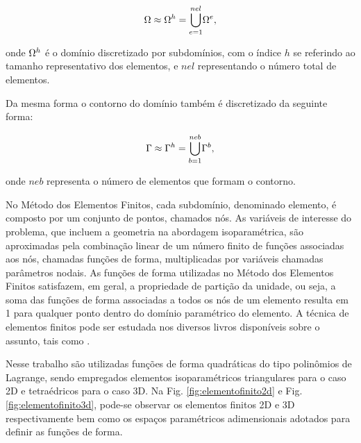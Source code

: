 \documentclass[tese_patricia]{subfiles}%
\begin{document}
\begin{align}
	\Omega \approx \Omega^{h} = {\bigcup_{e = 1}^{nel}} \Omega^{e},
\end{align}

\noindent onde $\Omega^{h}$ é o domínio discretizado por subdomínios, com o índice $h$ se referindo ao tamanho representativo dos elementos, e $nel$ representando o número total de elementos.

Da mesma forma o contorno do domínio também é discretizado da seguinte forma:

\begin{align}
	\Gamma \approx \Gamma^{h} = {\bigcup_{b = 1}^{neb}} \Gamma^{b},
\end{align}

\noindent onde $neb$ representa o número de elementos que formam o contorno.

No Método dos Elementos Finitos, cada subdomínio, denominado elemento, é composto por um conjunto de pontos, chamados nós. As variáveis de interesse do problema, que incluem a geometria na abordagem isoparamétrica, são aproximadas pela combinação linear de um número finito de funções associadas aos nós, chamadas funções de forma, multiplicadas por variáveis chamadas parâmetros nodais. As funções de forma utilizadas no Método dos Elementos Finitos satisfazem, em geral, a propriedade de partição da unidade, ou seja, a soma das funções de forma associadas a todos os nós de um elemento resulta em 1 para qualquer ponto dentro do domínio paramétrico do elemento. A técnica de elementos finitos pode ser estudada nos diversos livros disponíveis sobre o assunto, tais como .

Nesse trabalho são utilizadas funções de forma quadráticas do tipo polinômios de Lagrange, sendo empregados elementos isoparamétricos triangulares para o caso 2D e tetraédricos para o caso 3D. Na Fig. \ref{fig:elementofinito2d} e Fig. \ref{fig:elementofinito3d}, pode-se observar os elementos finitos 2D e 3D respectivamente bem como os espaços paramétricos adimensionais adotados para definir as funções de forma. 
\end{document}
